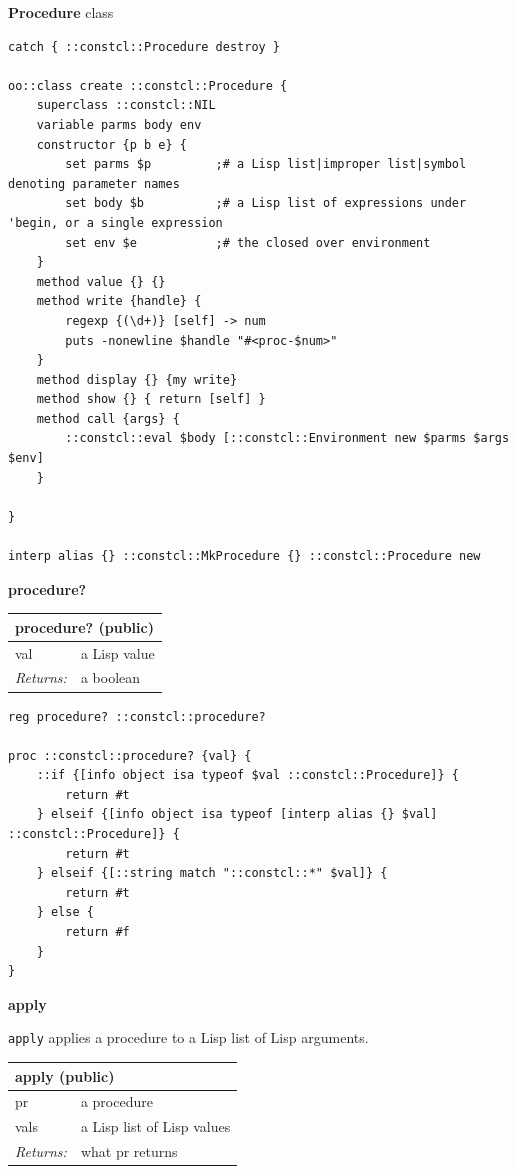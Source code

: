 \documentclass[twoside,9pt]{report}
\begin{document}
\textbf{Procedure} class

\noindent\makebox[\linewidth]{\rule{\linewidth}{0.4pt}}
\begin{lstlisting}
catch { ::constcl::Procedure destroy }
 
oo::class create ::constcl::Procedure {
    superclass ::constcl::NIL
    variable parms body env
    constructor {p b e} {
        set parms $p         ;# a Lisp list|improper list|symbol denoting parameter names
        set body $b          ;# a Lisp list of expressions under 'begin, or a single expression
        set env $e           ;# the closed over environment
    }
    method value {} {}
    method write {handle} {
        regexp {(\d+)} [self] -> num
        puts -nonewline $handle "#<proc-$num>"
    }
    method display {} {my write}
    method show {} { return [self] }
    method call {args} {
        ::constcl::eval $body [::constcl::Environment new $parms $args $env]
    }
 
}
 
interp alias {} ::constcl::MkProcedure {} ::constcl::Procedure new
\end{lstlisting}
\noindent\makebox[\linewidth]{\rule{\linewidth}{0.4pt}}

\textbf{procedure?}

\begin{tabular}{ |l l| }
\hline
\multicolumn{2}{|l|}{procedure? (public)} \\
\hline
val & a Lisp value \\
\textit{Returns:} & a boolean \\
\hline
\end{tabular}

\noindent\makebox[\linewidth]{\rule{\linewidth}{0.4pt}}
\begin{lstlisting}
reg procedure? ::constcl::procedure?
 
proc ::constcl::procedure? {val} {
    ::if {[info object isa typeof $val ::constcl::Procedure]} {
        return #t
    } elseif {[info object isa typeof [interp alias {} $val] ::constcl::Procedure]} {
        return #t
    } elseif {[::string match "::constcl::*" $val]} {
        return #t
    } else {
        return #f
    }
}
\end{lstlisting}
\noindent\makebox[\linewidth]{\rule{\linewidth}{0.4pt}}

\textbf{apply}


\texttt{apply} applies a procedure to a Lisp list of Lisp arguments.

\begin{tabular}{ |l l| }
\hline
\multicolumn{2}{|l|}{apply (public)} \\
\hline
pr & a procedure \\
vals & a Lisp list of Lisp values \\
\textit{Returns:} & what pr returns \\
\hline
\end{tabular}
\end{document}
